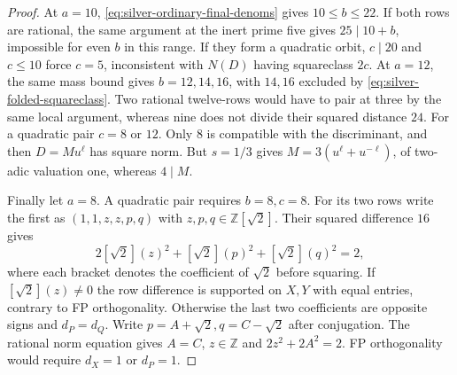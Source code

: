 \documentclass[11pt,reqno]{amsart}
\theoremstyle{remark}\newtheorem{remark}[theorem]{Remark}
\numberwithin{equation}{section}
\begin{document}
\begin{proof}
At $a=10$, \eqref{eq:silver-ordinary-final-denoms} gives $10\le b\le22$. If both rows are rational, the same argument at the inert prime five gives $25\mid10+b$, impossible for even $b$ in this range. If they form a quadratic orbit, $c\mid20$ and $c\le10$ force $c=5$, inconsistent with $N(D)$ having squareclass $2c$. At $a=12$, the same mass bound gives $b=12,14,16$, with $14,16$ excluded by \eqref{eq:silver-folded-squareclass}. Two rational twelve-rows would have to pair at three by the same local argument, whereas nine does not divide their squared distance $24$. For a quadratic pair $c=8$ or $12$. Only $8$ is compatible with the discriminant, and then $D=Mu^\ell$ has square norm. But $s=1/3$ gives $M=3(u^\ell+u^{-\ell})$, of two-adic valuation one, whereas $4\mid M$.

Finally let $a=8$. A quadratic pair requires $b=8,c=8$. For its two rows write the first as $(1,1,z,z,p,q)$ with $z,p,q\in\mathbb Z[\sqrt2]$. Their squared difference $16$ gives
\[
 2[\sqrt2](z)^2+[\sqrt2](p)^2+[\sqrt2](q)^2=2,
\]
where each bracket denotes the coefficient of $\sqrt2$ before squaring. If $[\sqrt2](z)\ne0$ the row difference is supported on $X,Y$ with equal entries, contrary to FP orthogonality. Otherwise the last two coefficients are opposite signs and $d_P=d_Q$. Write $p=A+\sqrt2,q=C-\sqrt2$ after conjugation. The rational norm equation gives $A=C$, $z\in\mathbb Z$ and $2z^2+2A^2=2$. FP orthogonality would require $d_X=1$ or $d_P=1$.


\end{proof}
\end{document}
